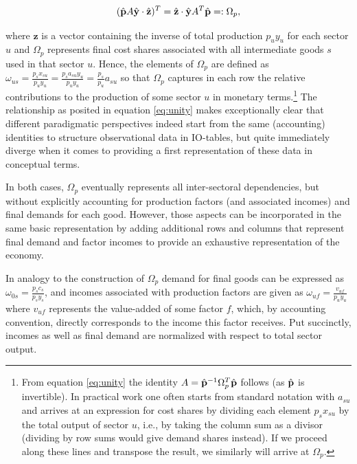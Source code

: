 \begin{align}
    \label{eq:unity}
    (\hat {\mathbf p} A \hat {\mathbf y} \cdot \hat {\mathbf z})^T = \hat {\mathbf z} \cdot  \hat {\mathbf y} A^T \hat {\mathbf p} =: \Omega_{p},
\end{align}

where ${\mathbf z}$ is a vector containing the inverse of total production $p_u y_u$ for each sector $u$ and $\Omega_p$ represents final cost shares associated with all intermediate goods $s$ used in that sector $u$.
Hence, the elements of $\Omega_p$ are defined as $\omega_{us}=\frac{p_sx_{su}}{p_uy_u}=\frac{p_sa_{su}y_u}{p_uy_u}=\frac{p_s}{p_u}a_{su}$ so that $\Omega_p$ captures in each row the relative contributions to the production of some sector $u$ in monetary terms.\footnote{From equation \eqref{eq:unity} the identity $A = \hat {\mathbf p}^{-1} \Omega_p^T \hat {\mathbf p}$ follows (as $\hat {\mathbf p}$ is invertible). In practical work one often starts from standard notation with $a_{su}$ and arrives at an expression for cost shares by dividing each element $p_sx_{su}$ by the total output of sector $u$, i.e., by taking the column sum as a divisor (dividing by row sums would give demand shares instead). 
If we proceed along these lines and transpose the result, we similarly will arrive at $\Omega_p$.}
The relationship as posited in equation \eqref{eq:unity} makes exceptionally clear that different paradigmatic perspectives indeed start from the same (accounting) identities to structure observational data in IO-tables, but quite immediately diverge when it comes to providing a first representation of these data in conceptual terms.

In both cases, $\Omega_p$ eventually represents all inter-sectoral dependencies, but without explicitly accounting for production factors (and associated incomes) and final demands for each good. However, those aspects can be incorporated in the same basic representation by adding additional rows and columns that represent final demand and factor incomes to provide an exhaustive representation of the economy. 

In analogy to the construction of $\Omega_p$ demand for final goods can be expressed as $\omega_{0s}=\frac{p_s c_s}{p_s y_s}$, and incomes associated with production factors are given as $\omega_{uf}=\frac{v_{uf}}{p_u y_u}$ where $v_{uf}$ represents the value-added of some factor $f$, which, by accounting convention, directly corresponds to the income this factor receives. Put succinctly, incomes as well as final demand are normalized with respect to total sector output. 

